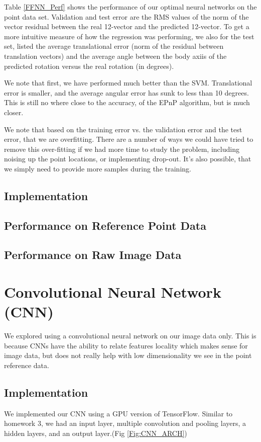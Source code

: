 \documentclass[journal]{IEEEtran}
\begin{document}
Table \ref{FFNN_Perf} shows the performance of our optimal neural networks on the point data set. Validation and test error are the RMS values of the norm of the vector residual between the real 12-vector and the predicted 12-vector. To get a more intuitive measure of how the regression was performing, we also for the test set, listed the average translational error (norm of the residual between translation vectors) and the average angle between the body axiis of the predicted rotation versus the real rotation (in degrees).

We note that first, we have performed much better than the SVM. Translational error is smaller, and the average angular error has sunk to less than 10 degrees. This is still no where close to the accuracy, of the EPnP algorithm, but is much closer.

We note that based on the training error vs. the validation error and the test error, that we are overfitting. There are a number of ways we could have tried to remove this over-fitting if we had more time to study the problem, including noising up the point locations, or implementing drop-out. It's also possible, that we simply need to provide more samples during the training.

\subsection{Implementation}

\subsection{Performance on Reference Point Data}

\subsection{Performance on Raw Image Data}

\section{Convolutional Neural Network (CNN)}
We explored using a convolutional neural network on our image data only. This is because CNNs have the ability to relate features locality which makes sense for image data, but does not really help with low dimensionality we see in the point reference data.  

\subsection{Implementation}
We implemented our CNN using a GPU version of TensorFlow. Similar to homework 3, we had an input layer, multiple convolution and pooling layers, a hidden layers, and an output layer.(Fig \ref{Fig:CNN_ARCH})
\end{document}

